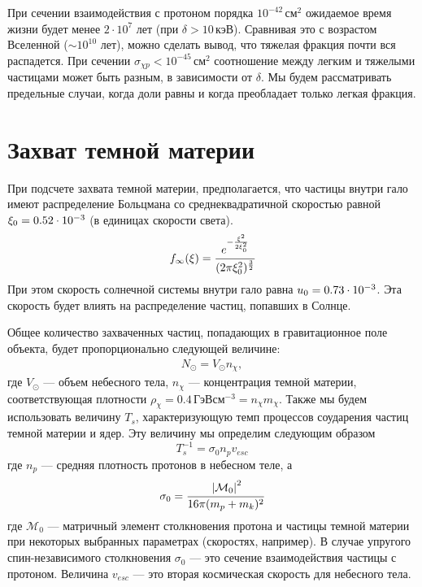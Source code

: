 При сечении взаимодействия с протоном порядка $10^{-42} \,\text{см}^2$ ожидаемое время жизни будет менее $2 \cdot 10^7$ лет (при $\delta > 10 \,\text{кэВ}$). Сравнивая это с возрастом Вселенной ($\sim 10^{10}$ лет), можно сделать вывод, что тяжелая фракция почти вся распадется. При сечении $\sigma_{\chi p} < 10^{-45} \,\text{см}^2$ соотношение между легким и тяжелыми частицами может быть разным, в зависимости от $\delta$. Мы будем рассматривать предельные случаи, когда доли равны и когда преобладает только легкая фракция.


\section{Захват темной материи}

При подсчете захвата темной материи, предполагается, что частицы внутри гало имеют распределение Больцмана со среднеквадратичной скоростью равной $\xi_0 = {0.52}\cdot 10^{-3}$ (в единицах скорости света).
\begin{equation}
	\label{dens_infty_xi}
	f_{\infty}(\xi)  = 
	\cfrac{e^{-\frac{\xi^2}{2\xi_0^2}}}{(2\pi\xi_0^2)^{\frac{3}{2}}}
\end{equation}
При этом скорость солнечной системы внутри гало равна $u_0 = {0.73}\cdot 10^{-3}$. Эта скорость будет влиять на распределение частиц, попавших в Солнце. 

Общее количество захваченных частиц, попадающих в гравитационное поле объекта, будет пропорционально следующей величине:
\begin{eqnarray}
	\label{eq:N_solar}
	N_{\odot} = V_{\odot} n_{\chi},
\end{eqnarray}
где $V_{\odot}$ --- объем небесного тела, $n_{\chi}$ --- концентрация темной материи, соответствующая плотности $\rho_{\chi} = 0.4 \,\text{ГэВ} \text{см}^{-3} = n_{\chi} m_{\chi}$.
Также мы будем использовать величину $T_s$, характеризующую темп процессов соударения частиц темной материи и ядер. Эту величину мы определим следующим образом
\begin{equation}
	\label{eq:T_s}
	T_s^{-1} = \sigma_{0} n_p v_{esc}
\end{equation}
где $n_p$ --- средняя плотность протонов в небесном теле, а 
\begin{equation}
	\label{sigma_0}
	\sigma_0 = \cfrac{\left| \mathcal{M}_0 \right|^{2}}{16\pi (m_p+m_k)^2}
\end{equation}
где $\mathcal{M}_0$ --- матричный элемент столкновения протона и частицы темной материи при некоторых выбранных параметрах (скоростях, например). В случае упругого спин-независимого столкновения $\sigma_0$ --- это сечение взаимодействия частицы с протоном.
Величина $v_{esc}$ --- это вторая космическая скорость для небесного тела.

